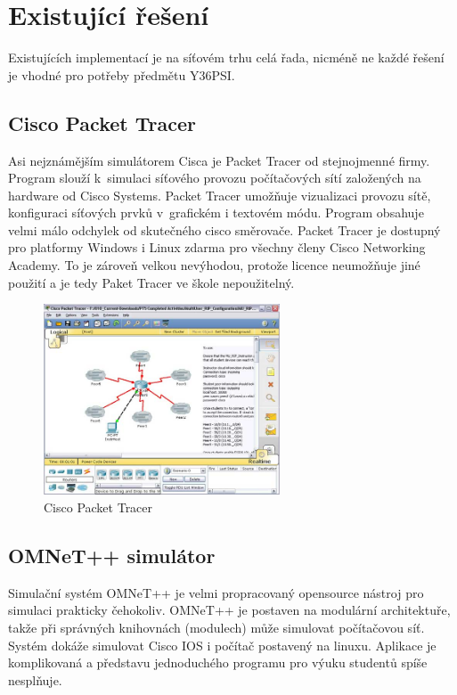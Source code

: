 \chapter{Existující řešení}
Existujících implementací je na síťovém trhu celá řada, nicméně ne každé řešení je vhodné pro potřeby předmětu Y36PSI.

\section{Cisco Packet Tracer}
Asi nejznámějším simulátorem Cisca je Packet Tracer \cite{cisco:pt} od stejnojmenné firmy. Program slouží k~simulaci síťového provozu počítačových sítí založených na hardware od Cisco Systems. Packet Tracer umožňuje vizualizaci provozu sítě, konfiguraci síťových prvků v~grafickém i textovém módu. Program obsahuje velmi málo odchylek od skutečného cisco směrovače. Packet Tracer je dostupný pro platformy Windows i Linux zdarma pro všechny členy Cisco Networking Academy. To je zároveň velkou nevýhodou, protože licence neumožňuje jiné použití a je tedy Paket Tracer ve škole nepoužitelný.

\begin{figure}[h]
\begin{center}
\includegraphics[width=7cm]{figures/r_cpt}
\caption{Cisco Packet Tracer}
\label{fig:r_cpt}
\end{center}
\end{figure}

\section{OMNeT++ simulátor} 
Simulační systém OMNeT++ \cite{reserse:omnet_hp} je velmi propracovaný opensource nástroj pro simulaci prakticky čehokoliv. OMNeT++ je postaven na modulární architektuře, takže při správných knihovnách (modulech) může simulovat počítačovou síť. Systém dokáže simulovat Cisco IOS i počítač postavený na linuxu. Aplikace je komplikovaná a představu jednoduchého programu pro výuku studentů spíše nesplňuje.

